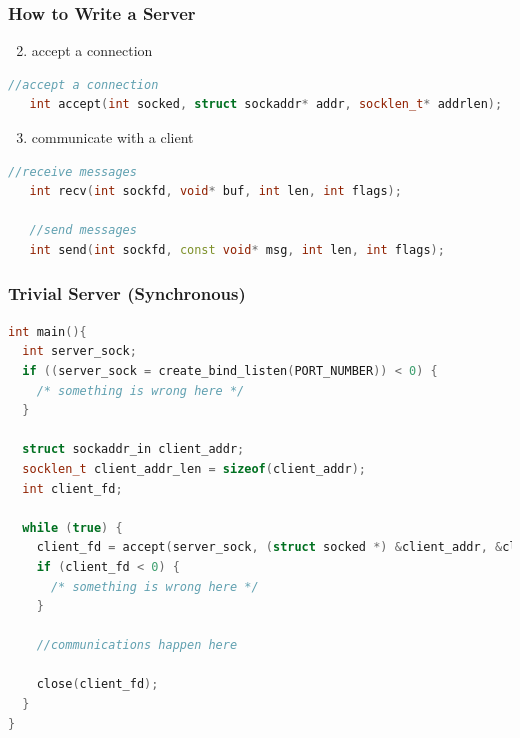 \documentclass[aspectratio=43]{beamer}
\begin{document}
\begin{frame}[fragile]
  \frametitle{How to Write a Server}

   \begin{enumerate}
   \setcounter{enumi}{1}
   \item accept a connection
    \end{enumerate}
    \begin{lstlisting}[language=C++,basicstyle=\ttfamily\footnotesize,commentstyle=\color{commgreen},keywordstyle=\color{blue},breaklines=true]
   //accept a connection
   int accept(int socked, struct sockaddr* addr, socklen_t* addrlen);
   \end{lstlisting}
   
   \begin{enumerate}
   \setcounter{enumi}{2}
   \item communicate with a client
   \end{enumerate}
   
   \begin{lstlisting}[language=C++,basicstyle=\ttfamily\footnotesize,commentstyle=\color{commgreen},keywordstyle=\color{blue},breaklines=true]
   //receive messages
   int recv(int sockfd, void* buf, int len, int flags);
   
   //send messages
   int send(int sockfd, const void* msg, int len, int flags);
   \end{lstlisting}
\end{frame}

\begin{frame}[fragile]
  \frametitle{Trivial Server (Synchronous)}

\begin{lstlisting}[language=C++,basicstyle=\ttfamily\footnotesize,commentstyle=\color{commgreen},keywordstyle=\color{blue},breaklines=true]
int main(){
  int server_sock;
  if ((server_sock = create_bind_listen(PORT_NUMBER)) < 0) {
    /* something is wrong here */
  }
    
  struct sockaddr_in client_addr;
  socklen_t client_addr_len = sizeof(client_addr);
  int client_fd;
    
  while (true) {
    client_fd = accept(server_sock, (struct socked *) &client_addr, &client_addr_len);
    if (client_fd < 0) {
      /* something is wrong here */
    }

    //communications happen here

    close(client_fd);
  }
}
   \end{lstlisting}
\end{frame}
\end{document}
